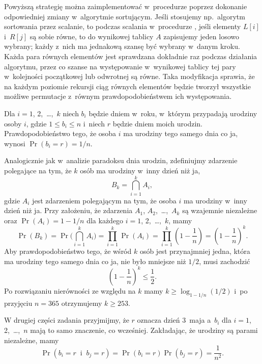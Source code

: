 Powyższą strategię można zaimplementować w~procedurze  poprzez dokonanie odpowiedniej zmiany w~algorytmie sortującym. Jeśli stosujemy np.\ algorytm sortowania przez scalanie, to podczas scalania w~procedurze , jeśli elementy $L[i]$ i~$R[j]$ są sobie równe, to do wynikowej tablicy $A$ zapisujemy jeden losowo wybrany; każdy z~nich ma jednakową szansę być wybrany w~danym kroku. Każda para równych elementów jest sprawdzana dokładnie raz podczas działania algorytmu, przez co szanse na występowanie w~wynikowej tablicy tej pary w~kolejności początkowej lub odwrotnej są równe. Taka modyfikacja sprawia, że na każdym poziomie rekursji ciąg równych elementów będzie tworzył wszystkie możliwe permutacje z~równym prawdopodobieństwem ich występowania.


\exercise %
Dla $i=1$, 2,~\dots,~$k$ niech $b_i$ będzie dniem w~roku, w~którym przypadają urodziny osoby $i$, gdzie $1\le b_i\le n$ i~niech $r$ będzie dniem moich urodzin. Prawdopodobieństwo tego, że osoba $i$ ma urodziny tego samego dnia co ja, wynosi $\Pr(b_i=r)=1/n$.

Analogicznie jak w~analizie paradoksu dnia urodzin, zdefiniujmy zdarzenie polegające na tym, że $k$ osób ma urodziny w~inny dzień niż ja,
\[
	B_k = \bigcap_{i=1}^kA_i,
\]
gdzie $A_i$ jest zdarzeniem polegającym na tym, że osoba $i$ ma urodziny w~inny dzień niż ja. Przy założeniu, że zdarzenia $A_1$, $A_2$,~\dots,~$A_k$ są wzajemnie niezależne oraz $\Pr(A_i)=1-1/n$ dla każdego $i=1$, 2,~\dots,~$k$, mamy
\[
	\Pr(B_k) = \Pr\biggl(\bigcap_{i=1}^kA_i\biggr) = \prod_{i=1}^k\Pr(A_i) = \prod_{i=1}^k\left(1-\frac{1}{n}\right) = \left(1-\frac{1}{n}\right)^k.
\]
Aby prawdopodobieństwo tego, że wśród $k$ osób jest przynajmniej jedna, która ma urodziny tego samego dnia co ja, nie było mniejsze niż $1/2$, musi zachodzić
\[
	\left(1-\frac{1}{n}\right)^k \le \frac{1}{2}.
\]
Po rozwiązaniu nierówności ze względu na $k$ mamy $k\ge\log_{1-1/n}(1/2)$ i~po przyjęciu $n=365$ otrzymujemy $k\ge253$.

W drugiej części zadania przyjmijmy, że $r$ oznacza dzień 3~maja a~$b_i$ dla $i=1$, 2,~\dots,~$n$ mają to samo znaczenie, co wcześniej. Zakładając, że urodziny są parami niezależne, mamy
\[
	\Pr(b_i=r\;\;\text{i}\;\;b_j=r) = \Pr(b_i=r)\Pr(b_j=r) = \frac{1}{n^2}.
\]

